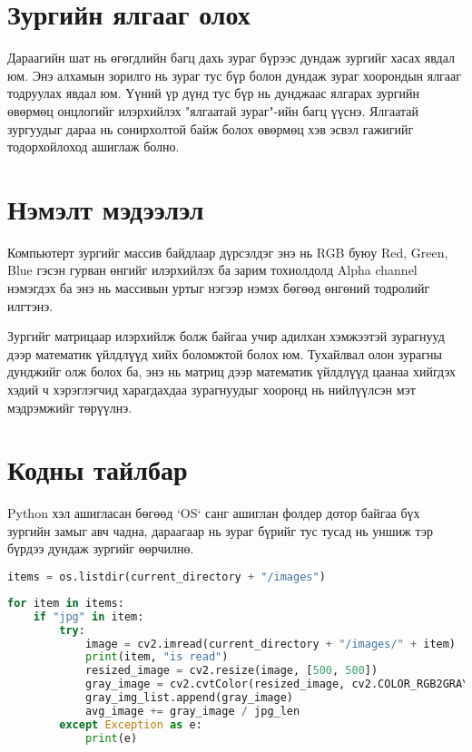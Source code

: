 \section{Зургийн ялгааг олох}
Дараагийн шат нь өгөгдлийн багц дахь зураг бүрээс дундаж зургийг хасах явдал юм. Энэ алхамын зорилго нь зураг тус бүр болон дундаж зураг хоорондын ялгааг тодруулах явдал юм. Үүний үр дүнд тус бүр нь дунджаас ялгарах зургийн өвөрмөц онцлогийг илэрхийлэх "ялгаатай зураг"-ийн багц үүснэ. Ялгаатай зургуудыг дараа нь сонирхолтой байж болох өвөрмөц хэв эсвэл гажигийг тодорхойлоход ашиглаж болно.

\section{Нэмэлт мэдээлэл}

Компьютерт зургийг массив байдлаар дүрсэлдэг энэ нь RGB буюу Red, Green, Blue гэсэн гурван өнгийг илэрхийлэх ба зарим тохиолдолд Alpha channel нэмэгдэх ба энэ нь массивын уртыг нэгээр нэмэх бөгөөд өнгөний тодролийг илгтэнэ.

Зургийг матрицаар илэрхийлж болж байгаа учир адилхан хэмжээтэй зурагнууд дээр математик үйлдлүүд хийх боломжтой болох юм. Тухайлвал олон зурагны дунджийг олж болох ба, энэ нь матриц дээр математик үйлдлүүд цаанаа хийгдэх хэдий ч хэрэглэгчид харагдахдаа зурагнуудыг хооронд нь нийлүүлсэн мэт мэдрэмжийг төрүүлнэ.

\section{Кодны тайлбар}
Python хэл ашигласан бөгөөд `OS` санг ашиглан фолдер дотор байгаа бүх зургийн замыг авч чадна, дараагаар нь зураг бүрийг тус тусад нь уншиж тэр бүрдээ дундаж зургийг өөрчилнө.



\begin{lstlisting}[language=Python, caption=Дундаж зураг тооцоолох код, frame=single]
items = os.listdir(current_directory + "/images")
\end{lstlisting}

\begin{lstlisting}[language=Python, caption=Дундаж зураг тооцоолох код, frame=single]
	for item in items:
    if "jpg" in item:
        try:
            image = cv2.imread(current_directory + "/images/" + item)
            print(item, "is read")
            resized_image = cv2.resize(image, [500, 500])
            gray_image = cv2.cvtColor(resized_image, cv2.COLOR_RGB2GRAY)
            gray_img_list.append(gray_image)
            avg_image += gray_image / jpg_len
        except Exception as e:
            print(e)
\end{lstlisting}

